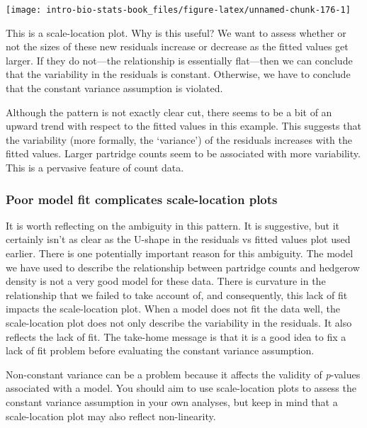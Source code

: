 \documentclass[
]{book}
\newenvironment{greybox}{
  \definecolor{shadecolor}{rgb}{0.95,0.95,0.95}  %
  \color{black}
  \begin{shaded}}
 {\end{shaded}}
\newenvironment{infobox}[1]
  {
  \begin{itemize}
  \renewcommand{\labelitemi}{
    \raisebox{-.7\height}[0pt][0pt]{
      {\setkeys{Gin}{width=3em,keepaspectratio}
        \texttt{[image: images/\#1]}}
    }
  }
  \setlength{\fboxsep}{1em}
  \begin{greybox}
  \item
  }
  {
  \end{greybox}
  \end{itemize}
  }
\begin{document}
\begin{center}\texttt{[image: intro-bio-stats-book\_files/figure-latex/unnamed-chunk-176-1]} \end{center}

This is a scale-location plot. Why is this useful? We want to assess whether or not the sizes of these new residuals increase or decrease as the fitted values get larger. If they do not---the relationship is essentially flat---then we can conclude that the variability in the residuals is constant. Otherwise, we have to conclude that the constant variance assumption is violated.

Although the pattern is not exactly clear cut, there seems to be a bit of an upward trend with respect to the fitted values in this example. This suggests that the variability (more formally, the `variance') of the residuals increases with the fitted values. Larger partridge counts seem to be associated with more variability. This is a pervasive feature of count data.

\begin{infobox}{information}

\hypertarget{poor-model-fit-complicates-scale-location-plots}{%
\subsubsection*{Poor model fit complicates scale-location plots}\label{poor-model-fit-complicates-scale-location-plots}}

It is worth reflecting on the ambiguity in this pattern. It is suggestive, but it certainly isn't as clear as the U-shape in the residuals vs fitted values plot used earlier. There is one potentially important reason for this ambiguity. The model we have used to describe the relationship between partridge counts and hedgerow density is not a very good model for these data. There is curvature in the relationship that we failed to take account of, and consequently, this lack of fit impacts the scale-location plot. When a model does not fit the data well, the scale-location plot does not only describe the variability in the residuals. It also reflects the lack of fit. The take-home message is that it is a good idea to fix a lack of fit problem before evaluating the constant variance assumption.

\end{infobox}

Non-constant variance can be a problem because it affects the validity of \emph{p}-values associated with a model. You should aim to use scale-location plots to assess the constant variance assumption in your own analyses, but keep in mind that a scale-location plot may also reflect non-linearity.
\end{document}
